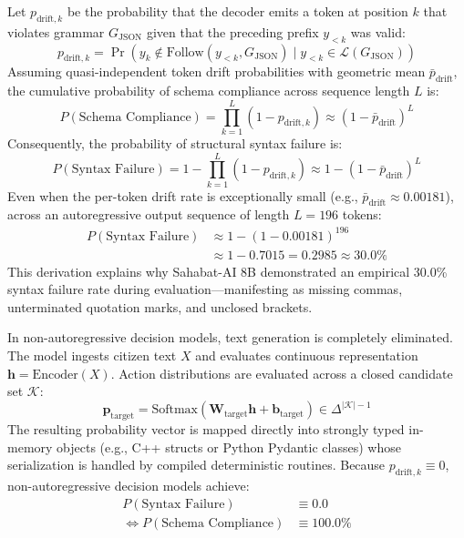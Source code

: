 \documentclass[journal,compsoc]{IEEEtran}
\begin{document}
Let $p_{\text{drift}, k}$ be the probability that the decoder emits a token at position $k$ that violates grammar $G_{\text{JSON}}$ given that the preceding prefix $y_{<k}$ was valid:
\begin{equation}
p_{\text{drift}, k} = \Pr(y_k \notin \text{Follow}(y_{<k}, G_{\text{JSON}}) \mid y_{<k} \in \mathcal{L}(G_{\text{JSON}}))
\end{equation}
Assuming quasi-independent token drift probabilities with geometric mean $\bar{p}_{\text{drift}}$, the cumulative probability of schema compliance across sequence length $L$ is:
\begin{equation}
P(\text{Schema Compliance}) = \prod_{k=1}^{L} (1 - p_{\text{drift}, k}) \approx (1 - \bar{p}_{\text{drift}})^L
\end{equation}
Consequently, the probability of structural syntax failure is:
\begin{equation}
P(\text{Syntax Failure}) = 1 - \prod_{k=1}^{L} (1 - p_{\text{drift}, k}) \approx 1 - (1 - \bar{p}_{\text{drift}})^L
\end{equation}
Even when the per-token drift rate is exceptionally small (e.g., $\bar{p}_{\text{drift}} \approx 0.00181$), across an autoregressive output sequence of length $L = 196$ tokens:
\begin{equation}
\begin{aligned}
P(\text{Syntax Failure}) &\approx 1 - (1 - 0.00181)^{196} \\
&\approx 1 - 0.7015 = 0.2985 \approx 30.0\%
\end{aligned}
\end{equation}
This derivation explains why Sahabat-AI 8B demonstrated an empirical 30.0\% syntax failure rate during evaluation—manifesting as missing commas, unterminated quotation marks, and unclosed brackets.

In non-autoregressive decision models, text generation is completely eliminated. The model ingests citizen text $X$ and evaluates continuous representation $\mathbf{h} = \text{Encoder}(X)$. Action distributions are evaluated across a closed candidate set $\mathcal{K}$:
\begin{equation}
\mathbf{p}_{\text{target}} = \text{Softmax}(\mathbf{W}_{\text{target}} \mathbf{h} + \mathbf{b}_{\text{target}}) \in \Delta^{|\mathcal{K}|-1}
\end{equation}
The resulting probability vector is mapped directly into strongly typed in-memory objects (e.g., C++ structs or Python Pydantic classes) whose serialization is handled by compiled deterministic routines. Because $p_{\text{drift}, k} \equiv 0$, non-autoregressive decision models achieve:
\begin{equation}
\begin{aligned}
P(\text{Syntax Failure}) &\equiv 0.0 \\
\iff P(\text{Schema Compliance}) &\equiv 100.0\%
\end{aligned}
\end{equation}
\end{document}
